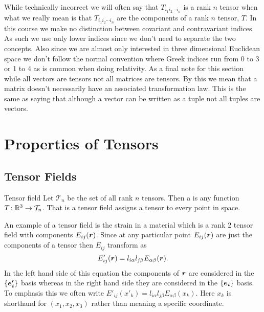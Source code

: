 While technically incorrect we will often say that \(T_{i_1i_2\dotsm i_n}\) is a rank \(n\) tensor when what we really mean is that \(T_{i_1i_2\dotsm i_n}\) are the components of a rank \(n\) tensor, \(T\).
In this course we make no distinction between covariant and contravariant indices.
As such we use only lower indices since we don't need to separate the two concepts.
Also since we are almost only interested in three dimensional Euclidean space we don't follow the normal convention where Greek indices run from 0 to 3 or 1 to 4 as is common when doing relativity.
As a final note for this section while all vectors are tensors not all matrices are tensors.
By this we mean that a matrix doesn't necessarily have an associated transformation law.
This is the same as saying that although a vector can be written as a tuple not all tuples are vectors.

\section{Properties of Tensors}
\subsection{Tensor Fields}
\begin{definition}{Tensor field}{}
    Let \(\mathcal{T}_n\) be the set of all rank \(n\) tensors.
    Then a  is any function \(T\colon\mathbb{R}^3 \to \mathcal{T}_n\).
    That is a tensor field assigns a tensor to every point in space.
\end{definition}
An example of a tensor field is the strain in a material which is a rank 2 tensor field with components \(E_{ij}(\bm{r})\).
Since at any particular point \(E_{ij}(\bm{r})\) are just the components of a tensor then \(E_{ij}\) transform as
\[E'_{ij}(\bm{r}) = l_{i\alpha}l_{j\beta}E_{\alpha\beta}(\bm{r}).\]
In the left hand side of this equation the components of \(\bm{r}\) are considered in the \(\{\bm{e'_i}\}\) basis whereas in the right hand side they are considered in the \(\{\bm{e_{i}}\}\) basis.
To emphasis this we often write \(E'_{ij}(x'_k) = l_{i\alpha}l_{j\beta}E_{\alpha\beta}(x_k)\).
Here \(x_k\) is shorthand for \((x_1, x_2, x_3)\) rather than meaning a specific coordinate.

